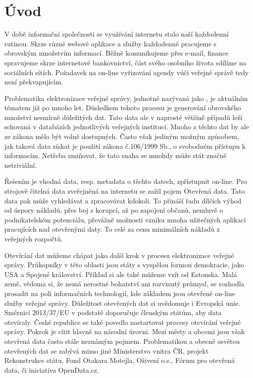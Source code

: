 \chapter{Úvod}

V době informační společnosti se využívání internetu stalo naší každodenní rutinou. Skrze různé webové aplikace a služby každodenně pracujeme s obrovským množstvím informací. Běžně komunikujeme přes e-mail, finance spravujeme skrze internetové bankovnictví, část svého osobního života sdílíme na sociálních sítích. Požadavek na on-line vyřizování agendy vůči veřejné správě tedy není překvapujícím.

Problematika elektronizace veřejné správy, jednotně nazývaná jako , je aktuálním tématem již po mnoho let. Důsledkem tohoto procesu je generování obrovského množství nesmírně důležitých dat. Tato data ale v naprosté většině případů leží schovaná v databázích jednotlivých veřejných institucí. Mnoho z těchto dat by ale ze zákona mělo být volně dostupných. Často však jediným možným způsobem, jak taková data získat je použití zákona č.106/1999 Sb.\cite{z106}, o svobodném přístupu k informacím. Netřeba zmiňovat, že tato snaha se mnohdy může stát značně netriviální.

Řešením je vhodná data, resp. metadata o těchto datech, zpřístupnit on-line. Pro strojově čitelná data zveřejněná na internetu se zažil pojem Otevřená data. Tato data pak může vyhledávat a zpracovávat kdokoli. To přináší řadu dílčích výhod od úspory nákladů, přes boj s korupcí, až po zapojení občanů, nemluvě o podnikatelském potenciálu, převážně možnosti vzniku mnoha užitečných aplikací pracujících nad otevřenými daty. To celé za cenu minimálních nákladů z veřejných rozpočtů.

Otevírání dat můžeme chápat jako další krok v procesu elektronizace veřejné správy. Průkopníky v této oblasti jsou státy s vyspělou formou demokracie, jako USA a Spojené království. Příklad si ale také můžeme vzít od Estonska. Malá země, vědoma si, že nemá nerostné bohatství ani rozvinutý průmysl, se rozhodla prosadit na poli informačních technologií, kde základem jsou otevřené on-line služby veřejné správy. Důležitost otevřených dat si uvědomuje i Evropská unie. Směrnicí 2013/37/EU\cite{smeu} v podstatě doporučuje členským státům, aby data otevíraly. 
České republice se také povedlo nastartovat procesy otevírání veřejné správy. Pokrok je cítit hlavně na národní úrovni. Mezi městy a obcemi jsou však otevřená data často stále neznámým pojmem. Problematikou a obecně osvětou otevřených dat se zabývá mimo jiné Ministerstvo vnitra ČR\cite{mv}, projekt Rekonstrukce státu\cite{rek}, Fond Otakara Motejla\cite{fom}, Oživení o.s.\cite{oz}, Fórum pro otevřená data\cite{otevrenadata}, či iniciativa OpenData.cz\cite{od}.

